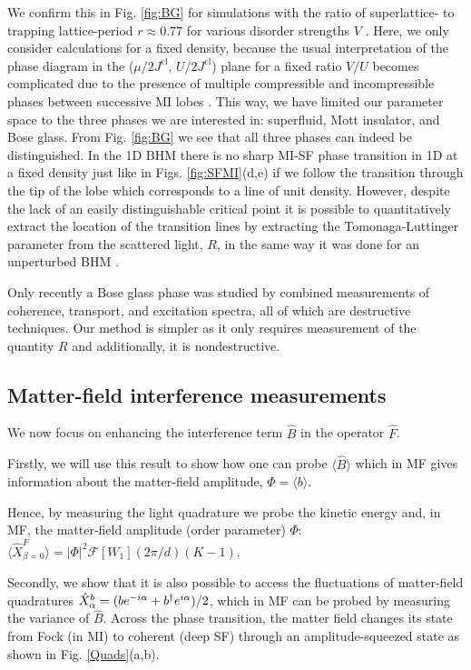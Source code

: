 We confirm this in Fig. \ref{fig:BG} for simulations with the ratio of
superlattice- to trapping lattice-period $r\approx 0.77$ for various
disorder strengths $V$ \cite{roux2008}. Here, we only consider
calculations for a fixed density, because the usual interpretation of
the phase diagram in the ($\mu/2J^\text{cl}$, $U/2J^\text{cl}$) plane
for a fixed ratio $V/U$ becomes complicated due to the presence of
multiple compressible and incompressible phases between successive MI
lobes \cite{roux2008}. This way, we have limited our parameter space
to the three phases we are interested in: superfluid, Mott insulator,
and Bose glass. From Fig. \ref{fig:BG} we see that all three phases
can indeed be distinguished. In the 1D BHM there is no sharp MI-SF
phase transition in 1D at a fixed density \cite{cazalilla2011,
  ejima2011, kuhner2000, pino2012, pino2013} just like in
Figs. \ref{fig:SFMI}(d,e) if we follow the transition through the tip
of the lobe which corresponds to a line of unit density. However,
despite the lack of an easily distinguishable critical point it is
possible to quantitatively extract the location of the transition
lines by extracting the Tomonaga-Luttinger parameter from the
scattered light, $R$, in the same way it was done for an unperturbed
BHM \cite{ejima2011}.

Only recently \cite{derrico2014} a Bose glass phase was studied by
combined measurements of coherence, transport, and excitation spectra,
all of which are destructive techniques. Our method is simpler as it
only requires measurement of the quantity $R$ and additionally, it is
nondestructive.

\subsection{Matter-field interference measurements}

We now focus on enhancing the interference term $\hat{B}$ in the
operator $\hat{F}$. 

Firstly, we will use this result to show how one can probe
$\langle \hat{B} \rangle$ which in MF gives information about the
matter-field amplitude, $\Phi = \langle b \rangle$. 

Hence, by measuring the light quadrature we probe the kinetic energy
and, in MF, the matter-field amplitude (order parameter) $\Phi$:
$\langle \hat{X}^F_{\beta=0} \rangle = | \Phi |^2
\mathcal{F}[W_1](2\pi/d) (K-1)$.

Secondly, we show that it is also possible to access the fluctuations
of matter-field quadratures $\hat{X}^b_\alpha = (b e^{-i\alpha} + b^\dagger
e^{i\alpha})/2$, which in MF can be probed by measuring the variance
of $\hat{B}$. Across the phase transition, the matter field changes
its state from Fock (in MI) to coherent (deep SF) through an
amplitude-squeezed state as shown in Fig. \ref{Quads}(a,b). 

